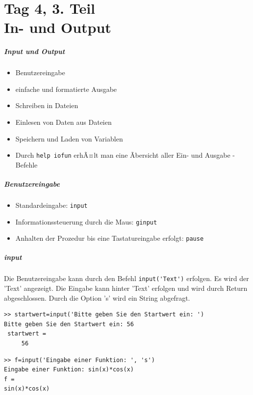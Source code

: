 \part{Tag 4,  3. Teil  \\ In- und Output}
%
%
\begin{frame}[fragile]\frametitle{Input und Output}
\begin{itemize}
\item Benutzereingabe
\item einfache und formatierte Ausgabe
\item Schreiben in Dateien
\item Einlesen von Daten aus Dateien
\item Speichern und Laden von Variablen\\
\item Durch \alert{ \lstinline!help iofun!} erhÃ¤lt man eine Ãbersicht aller Ein- und
  Ausgabe - Befehle
\end{itemize}
\end{frame}
%
%
\begin{frame}[fragile]\frametitle{Benutzereingabe}
\begin{itemize}
\item Standardeingabe: \alert{ \lstinline!input!}
\item Informationssteuerung durch die Maus: \alert{ \lstinline!ginput!}
\item Anhalten der Prozedur bis eine Tastatureingabe erfolgt: \alert{
  \lstinline!pause!} 
\end{itemize}
\end{frame} 
%
%
\begin{frame}[fragile]\frametitle{input}
Die Benutzereingabe kann durch den Befehl \lstinline!input('Text')! erfolgen. Es
wird der 'Text'  angezeigt. Die Eingabe kann hinter 'Text' erfolgen
und wird durch Return
abgeschlossen.  Durch die Option 's' wird ein String abgefragt.
  
\begin{lstlisting}
>> startwert=input('Bitte geben Sie den Startwert ein: ')
Bitte geben Sie den Startwert ein: 56
 startwert =
     56

\end{lstlisting}
\begin{lstlisting}
>> f=input('Eingabe einer Funktion: ', 's')
Eingabe einer Funktion: sin(x)*cos(x)
f =
sin(x)*cos(x)
\end{lstlisting}
\end{frame}
